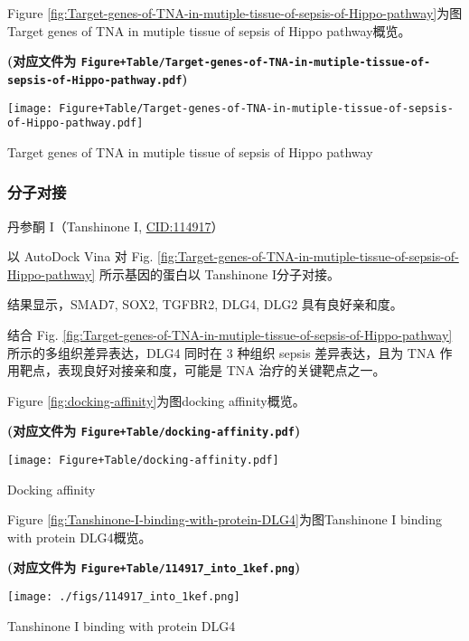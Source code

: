 \documentclass[
]{article}
\begin{document}
Figure \ref{fig:Target-genes-of-TNA-in-mutiple-tissue-of-sepsis-of-Hippo-pathway}为图Target genes of TNA in mutiple tissue of sepsis of Hippo pathway概览。

\textbf{(对应文件为 \texttt{Figure+Table/Target-genes-of-TNA-in-mutiple-tissue-of-sepsis-of-Hippo-pathway.pdf})}

\def\@captype{figure}
\begin{center}
\texttt{[image: Figure+Table/Target-genes-of-TNA-in-mutiple-tissue-of-sepsis-of-Hippo-pathway.pdf]}
\caption{Target genes of TNA in mutiple tissue of sepsis of Hippo pathway}\label{fig:Target-genes-of-TNA-in-mutiple-tissue-of-sepsis-of-Hippo-pathway}
\end{center}

\hypertarget{ux5206ux5b50ux5bf9ux63a5}{%
\subsubsection{分子对接}\label{ux5206ux5b50ux5bf9ux63a5}}

丹参酮 I（Tanshinone I, \url{CID:114917}）

以 AutoDock Vina 对 Fig. \ref{fig:Target-genes-of-TNA-in-mutiple-tissue-of-sepsis-of-Hippo-pathway} 所示基因的蛋白以 Tanshinone I分子对接。

结果显示，SMAD7, SOX2, TGFBR2, DLG4, DLG2 具有良好亲和度。

结合 Fig. \ref{fig:Target-genes-of-TNA-in-mutiple-tissue-of-sepsis-of-Hippo-pathway} 所示的多组织差异表达，DLG4 同时在 3 种组织 sepsis 差异表达，且为 TNA 作用靶点，表现良好对接亲和度，可能是 TNA 治疗的关键靶点之一。

Figure \ref{fig:docking-affinity}为图docking affinity概览。

\textbf{(对应文件为 \texttt{Figure+Table/docking-affinity.pdf})}

\def\@captype{figure}
\begin{center}
\texttt{[image: Figure+Table/docking-affinity.pdf]}
\caption{Docking affinity}\label{fig:docking-affinity}
\end{center}

Figure \ref{fig:Tanshinone-I-binding-with-protein-DLG4}为图Tanshinone I binding with protein DLG4概览。

\textbf{(对应文件为 \texttt{Figure+Table/114917\_into\_1kef.png})}

\def\@captype{figure}
\begin{center}
\texttt{[image: ./figs/114917\_into\_1kef.png]}
\caption{Tanshinone I binding with protein DLG4}\label{fig:Tanshinone-I-binding-with-protein-DLG4}
\end{center}
\end{document}
